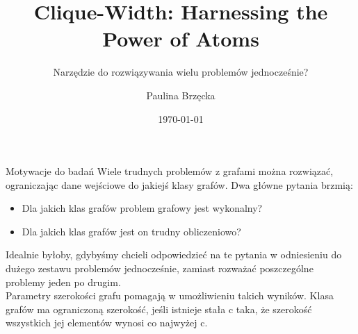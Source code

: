 \documentclass[polish]{beamer}
\title[Clique-Width: Harnessing the Power of Atoms]{Clique-Width: Harnessing the Power of Atoms}
\subtitle{Narzędzie do rozwiązywania wielu problemów jednocześnie?}
\author{Paulina Brzęcka}
\date{\today}
\begin{document}

\pgtitleframe



\begin{frame}{Motywacje do badań}
    Wiele trudnych problemów z grafami można rozwiązać, ograniczając dane wejściowe do jakiejś klasy grafów.
    Dwa główne pytania brzmią: 
    \begin{itemize}
        \item Dla jakich klas grafów problem grafowy jest wykonalny?
        \item Dla jakich klas grafów jest on trudny obliczeniowo?
    \end{itemize}
    Idealnie byłoby, gdybyśmy chcieli odpowiedzieć na te pytania w odniesieniu do dużego zestawu problemów 
    jednocześnie, zamiast rozważać poszczególne problemy jeden po drugim.\\
    Parametry szerokości grafu pomagają w umożliwieniu takich wyników. Klasa grafów ma ograniczoną 
    szerokość, jeśli istnieje stała c taka, że szerokość wszystkich jej elementów wynosi co najwyżej c.
\end{frame}
\end{document}
